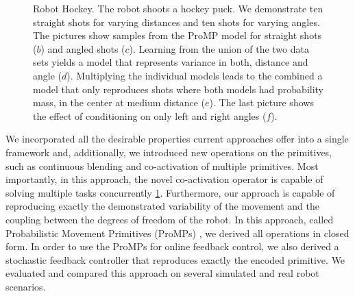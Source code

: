 \documentclass[final,5p,twocolumn]{elsarticle}
\begin{document}
\begin{figure}
\centering
{}

\vspace{0.2em}


\caption{Robot Hockey. The robot shoots a hockey puck. We demonstrate ten straight
shots for varying distances and ten shots for varying angles. The
pictures show samples from the ProMP model for straight shots ($b$)
and angled shots ($c$). Learning from the union of the two data sets yields a model
that represents variance in both, distance and angle ($d$). Multiplying
the individual models leads to the combined a model that only reproduces shots
where both models had probability mass, in the center at medium distance
($e$). The last picture shows the effect of conditioning on only left
and right angles ($f$).}
\label{fig:Robot-Hockey}

\end{figure}

We incorporated all the desirable properties 
current approaches offer into a single framework and, additionally, we 
introduced new operations on the primitives, such as continuous blending and
co-activation of multiple primitives.  Most importantly, in this approach, the
novel co-activation operator is capable of solving multiple tasks concurrently \ref{fig:Robot-Hockey}.
Furthermore, our approach is capable of reproducing exactly the demonstrated
variability of the movement and the coupling between the degrees of freedom of
the robot.  In this approach, called Probabilistic Movement Primitives (ProMPs) \cite{Paraschos2013,Paraschos2013a},
we derived all operations in closed form. In order to use the ProMPs for online
feedback control, we also derived a stochastic feedback controller that
reproduces exactly the encoded primitive. We evaluated and compared this approach
on several simulated and real robot scenarios.
\end{document}
